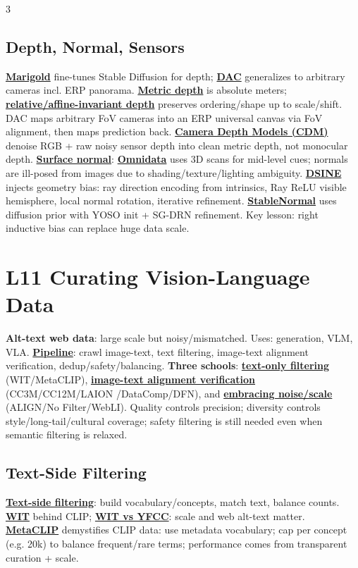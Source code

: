 \documentclass{article}
\numberwithin{equation}{subsection}
\newcommand{\key}[1]{\textbf{#1}}
\newcommand{\lowterm}[1]{\textbf{\underline{#1}}}
\begin{document}
\begin{multicols*}{3}
\subsection{Depth, Normal, Sensors}
\lowterm{Marigold} fine-tunes Stable Diffusion for depth; \lowterm{DAC} generalizes to arbitrary cameras incl. ERP panorama. \lowterm{Metric depth} is absolute meters; \lowterm{relative/affine-invariant depth} preserves ordering/shape up to scale/shift. DAC maps arbitrary FoV cameras into an ERP universal canvas via FoV alignment, then maps prediction back. \lowterm{Camera Depth Models (CDM)} denoise RGB + raw noisy sensor depth into clean metric depth, not monocular depth. \lowterm{Surface normal}: \lowterm{Omnidata} uses 3D scans for mid-level cues; normals are ill-posed from images due to shading/texture/lighting ambiguity. \lowterm{DSINE} injects geometry bias: ray direction encoding from intrinsics, Ray ReLU visible hemisphere, local normal rotation, iterative refinement. \lowterm{StableNormal} uses diffusion prior with YOSO init + SG-DRN refinement. Key lesson: right inductive bias can replace huge data scale.

\section{L11 Curating Vision-Language Data}
\key{Alt-text web data}: large scale but noisy/mismatched. Uses: generation, VLM, VLA. \lowterm{Pipeline}: crawl image-text, text filtering, image-text alignment verification, dedup/safety/balancing.
\key{Three schools}: \lowterm{text-only filtering} (WIT/MetaCLIP), \lowterm{image-text alignment verification} (CC3M/CC12M/LAION /DataComp/DFN), and \lowterm{embracing noise/scale} (ALIGN/No Filter/WebLI). Quality controls precision; diversity controls style/long-tail/cultural coverage; safety filtering is still needed even when semantic filtering is relaxed.
\subsection{Text-Side Filtering}
\lowterm{Text-side filtering}: build vocabulary/concepts, match text, balance counts. \lowterm{WIT} behind CLIP; \lowterm{WIT vs YFCC}: scale and web alt-text matter. \lowterm{MetaCLIP} demystifies CLIP data: use metadata vocabulary; cap per concept (e.g. 20k) to balance frequent/rare terms; performance comes from transparent curation + scale.

\end{multicols*}
\end{document}
